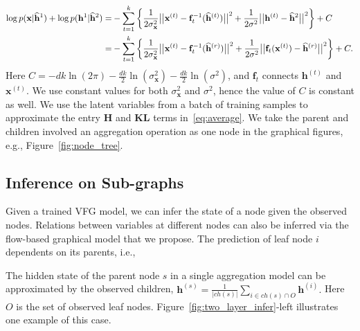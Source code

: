 \documentclass{article} %
\newcommand{\belhal}[1]{{\color{red}{\bf\sf [BK: #1]}}}
\begin{document}
\begin{align}\notag
\log p(\mathbf{x}|\widehat{\mathbf{h}}^1) + \log p(\mathbf{h}^1|\widehat{\mathbf{h}}^2)
=&-\sum_{t=1}^k\bigg\{ \frac{1}{2\sigma^2_{\mathbf{x}}}\big|\big| \mathbf{x}^{(t)} - \mathbf{f}_t^{-1}(\widehat{\mathbf{h}}^{(t)})\big|\big|^2 +  \frac{1}{2\sigma^2}\big|\big| \mathbf{h}^{(t)} -\widehat{\mathbf{h}}^2 \big|\big|^2 \bigg\} +C \\
=&-\sum_{t=1}^k\bigg\{ \frac{1}{2\sigma^2_{\mathbf{x}}}\big|\big| \mathbf{x}^{(t)} - \mathbf{f}_t^{-1}(\widehat{\mathbf{h}}^{(r)})\big|\big|^2 +  \frac{1}{2\sigma^2}\big|\big|  \mathbf{f}_t(\mathbf{x}^{(t)}) - \widehat{\mathbf{h}}^{(r)}\big|\big|^2 \bigg\} +C \label{eq:yllk} .
\end{align} 
Here $C=-dk\ln(2\pi)-\frac{dk}{2}\ln(\sigma_{\mathbf{x}}^2)-\frac{dk}{2}\ln(\sigma^2)$, and $\mathbf{f}_t$ connects $\mathbf{h}^{(t)}$ and $\mathbf{x}^{(t)}$. We use constant values for both  $\sigma^2_{\mathbf{x}}$ and $\sigma^2$, hence the value of $C$ is constant as well. We use the latent variables from a batch of training samples to approximate the entry \textbf{H} and \textbf{KL} terms in~\eqref{eq:average}. We take the parent and children involved an aggregation operation as one node in the graphical figures, e.g., Figure~\ref{fig:node_tree}. 

\subsection{Inference on Sub-graphs }
Given a trained VFG model, we can infer the state of a node given the observed nodes. 
Relations between variables at different nodes can also be inferred via the flow-based graphical model that we propose. 
The prediction of leaf node $i$ dependents on its parents, i.e., \belhal{to complete here}



The hidden state of the parent node $s$ in a single aggregation model can be approximated by the observed children,
$\mathbf{h}^{(s)}  = \frac{1}{|ch(s)|}\sum_{i \in ch(s) \cap O} \mathbf{h}^{(i)} .$
Here $O$ is the set of observed leaf nodes. Figure~\ref{fig:two_layer_infer}-left illustrates one example of this case. 
\end{document}

